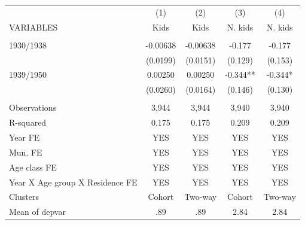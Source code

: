 \begin{tabular}{lcccc} \hline
 & (1) & (2) & (3) & (4) \\
VARIABLES & Kids & Kids & N. kids & N. kids \\ \hline
 &  &  &  &  \\
1930/1938 & -0.00638 & -0.00638 & -0.177 & -0.177 \\
 & (0.0199) & (0.0151) & (0.129) & (0.153) \\
1939/1950 & 0.00250 & 0.00250 & -0.344** & -0.344* \\
 & (0.0260) & (0.0164) & (0.146) & (0.130) \\
 &  &  &  &  \\
Observations & 3,944 & 3,944 & 3,940 & 3,940 \\
R-squared & 0.175 & 0.175 & 0.209 & 0.209 \\
Year FE & YES & YES & YES & YES \\
Mun. FE & YES & YES & YES & YES \\
Age class FE & YES & YES & YES & YES \\
Year X Age group X Residence FE & YES & YES & YES & YES \\
Clusters & Cohort & Two-way & Cohort & Two-way \\
 Mean of depvar & .89 & .89 & 2.84 & 2.84 \\ \hline
\end{tabular}
